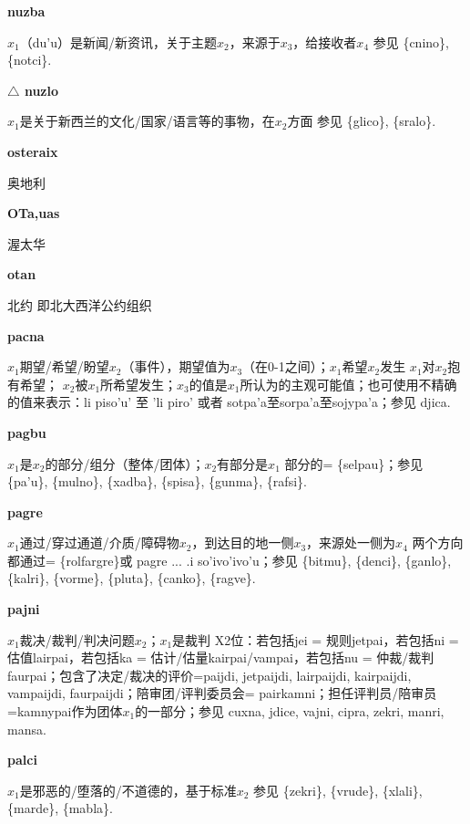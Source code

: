 \documentclass[notitlepage,twocolumn,a4paper,10pt]{book}
\begin{document}
{\sffamily\bfseries nuzba}\enspace {\ttfamily\bfseries[nuz]}  $x_1$（du'u）是新闻\slash{}新资讯，关于主题$x_2$，来源于$x_3$，给接收者$x_4$ \textemdash{} 参见 \{cnino\}, \{notci\}.

{\sffamily\bfseries $\triangle$ nuzlo} $x_1$是关于新西兰的文化\slash{}国家\slash{}语言等的事物，在$x_2$方面 \textemdash{} 参见 \{glico\}, \{sralo\}.

{\sffamily\bfseries osteraix} 奥地利

{\sffamily\bfseries OTa,uas} 渥太华

{\sffamily\bfseries otan} 北约 \textemdash{} 即北大西洋公约组织

{\sffamily\bfseries pacna}\enspace {\ttfamily\bfseries[        pa'a]}  $x_1$期望\slash{}希望\slash{}盼望$x_2$（事件），期望值为$x_3$（在0-1之间）；$x_1$希望$x_2$发生 \textemdash{} $x_1$对$x_2$抱有希望； $x_2$被$x_1$所希望发生；$x_3$的值是$x_1$所认为的主观可能值；也可使用不精确的值来表示：{li} {piso'u}' 至 '{li} {piro}' 或者 {sotpa'a}至{sorpa'a}至{sojypa'a}；参见 {djica}.

{\sffamily\bfseries pagbu}  $x_1$是$x_2$的部分\slash{}组分（整体\slash{}团体）；$x_2$有部分是$x_1$ \textemdash{} 部分的= \{selpau\}；参见 \{pa'u\}, \{mulno\}, \{xadba\}, \{spisa\}, \{gunma\}, \{rafsi\}.

{\sffamily\bfseries pagre}\enspace {\ttfamily\bfseries[    gre]}  $x_1$通过\slash{}穿过通道\slash{}介质\slash{}障碍物$x_2$，到达目的地一侧$x_3$，来源处一侧为$x_4$ \textemdash{} 两个方向都通过= \{rolfargre\}或 pagre ... .i so'ivo'ivo'u；参见 \{bitmu\}, \{denci\}, \{ganlo\}, \{kalri\}, \{vorme\}, \{pluta\}, \{canko\}, \{ragve\}.

{\sffamily\bfseries pajni}\enspace {\ttfamily\bfseries[        pai]}  $x_1$裁决\slash{}裁判\slash{}判决问题$x_2$；$x_1$是裁判 \textemdash{} X2位：若包括jei = 规则{jetpai}，若包括ni = 估值{lairpai}，若包括ka = 估计\slash{}估量{kairpai}\slash{}{vampai}，若包括nu = 仲裁\slash{}裁判{faurpai}；包含了决定\slash{}裁决的评价={paijdi}, {jetpaijdi}, {lairpaijdi}, {kairpaijdi}, {vampaijdi}, {faurpaijdi}；陪审团\slash{}评判委员会= {pairkamni}；担任评判员\slash{}陪审员={kamnypai}作为团体$x_1$的一部分；参见 {cuxna}, {jdice}, {vajni}, {cipra}, {zekri}, {manri}, {mansa}.

{\sffamily\bfseries palci}\enspace {\ttfamily\bfseries[pac]}  $x_1$是邪恶的\slash{}堕落的\slash{}不道德的，基于标准$x_2$ \textemdash{} 参见 \{zekri\}, \{vrude\}, \{xlali\}, \{marde\}, \{mabla\}.
\end{document}
